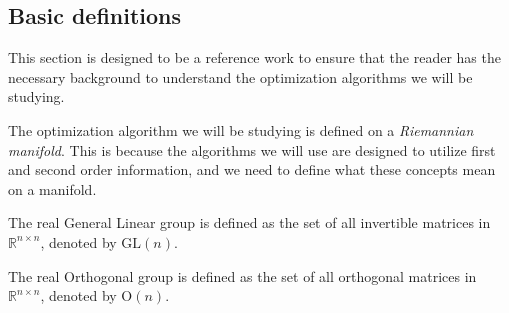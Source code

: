 \subsection{Basic definitions}
This section is designed to be a reference work to ensure that the reader has the necessary background to understand the optimization algorithms we will be studying. 

The optimization algorithm we will be studying is defined on a \textit{Riemannian manifold}. This is because the algorithms we will use are designed to utilize first and second order information, and we need to define what these concepts mean on a manifold. 





\begin{definition}\label{def:general_linear_group}
    The \textup{real General Linear group} is defined as the set of all invertible matrices in $\mathbb{R}^{n\times n}$, denoted by $\mathrm{GL}(n)$. \cite[Example~9.11]{Boumal2023}
\end{definition}

\begin{definition}\label{def:orthogonal_group}
    The \textup{real Orthogonal group} is defined as the set of all orthogonal matrices in $\mathbb{R}^{n\times n}$, denoted by $\mathrm{O}(n)$. \cite[p.~3]{Edelman1998}
\end{definition}

